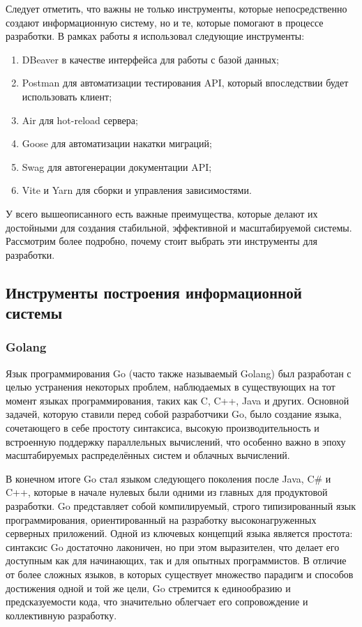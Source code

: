 \documentclass[diploma]{SCWorks}
\begin{document}
Следует отметить, что важны не только инструменты, которые непосредственно 
создают информационную систему, но и те, которые помогают в процессе разработки.
В рамках работы я использовал следующие инструменты:
\begin{enumerate}
    \item DBeaver в качестве интерфейса для работы с базой данных;
    \item Postman для автоматизации тестирования API, который впоследствии будет
    использовать клиент;
    \item Air для hot-reload сервера;
    \item Goose для автоматизации накатки миграций;
    \item Swag для автогенерации документации API;
    \item Vite и Yarn для сборки и управления зависимостями.
\end{enumerate}

У всего вышеописанного есть важные преимущества, которые делают 
их достойными для создания стабильной, эффективной и масштабируемой системы. 
Рассмотрим более подробно, почему стоит выбрать эти инструменты для разработки.

\subsection{Инструменты построения информационной системы}

\subsubsection{Golang}

Язык программирования Go (часто также называемый Golang) был разработан 
с целью устранения некоторых проблем, наблюдаемых в 
существующих на тот момент языках программирования, таких как C, C++, Java 
и других. Основной задачей, которую ставили перед собой разработчики Go, 
было создание языка, сочетающего в себе простоту синтаксиса, высокую 
производительность и встроенную поддержку параллельных вычислений, что 
особенно важно в эпоху масштабируемых распределённых систем и облачных 
вычислений.

В конечном итоге Go стал языком следующего поколения после Java, C\# и C++, 
которые в начале нулевых были одними из главных для продуктовой разработки. 
Go представляет собой компилируемый, строго типизированный язык 
программирования, ориентированный на разработку высоконагруженных серверных 
приложений. Одной из ключевых концепций языка является простота: синтаксис 
Go достаточно лаконичен, но при этом выразителен, что делает его доступным 
как для начинающих, так и для опытных программистов. В отличие от более 
сложных языков, в которых существует множество парадигм и способов достижения 
одной и той же цели, Go стремится к единообразию и предсказуемости кода, 
что значительно облегчает его сопровождение и коллективную разработку.
\end{document}
